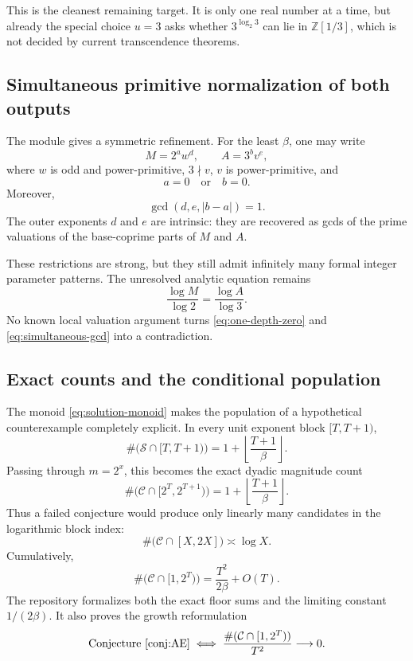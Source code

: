 \documentclass[11pt,oneside]{article}
\theoremstyle{definition}
\theoremstyle{remark}
\newcommand{\Z}{\mathbb Z}
\newcommand{\Sol}{\mathcal S}
\newcommand{\Cand}{\mathcal C}
\begin{document}
This is the cleanest remaining target.  It is only one real number at a time, but already the
special choice $u=3$ asks whether $3^{\log_2 3}$ can lie in $\Z[1/3]$, which is not decided by
current transcendence theorems.

\subsection{Simultaneous primitive normalization of both outputs}

The module  gives a symmetric refinement.  For the least
$\beta$, one may write
\[
  M=2^aw^d,
  \qquad A=3^bv^e,
\]
where $w$ is odd and power-primitive, $3\nmid v$, $v$ is power-primitive, and
\begin{equation}
  a=0\quad\text{or}\quad b=0.
  \label{eq:one-depth-zero}
\end{equation}
Moreover,
\begin{equation}
 \gcd\!\left(d,e,|b-a|\right)=1.
 \label{eq:simultaneous-gcd}
\end{equation}
The outer exponents $d$ and $e$ are intrinsic: they are recovered as gcds of the prime
valuations of the base-coprime parts of $M$ and $A$.

These restrictions are strong, but they still admit infinitely many formal integer parameter
patterns.  The unresolved analytic equation remains
\[
  \frac{\log M}{\log2}=\frac{\log A}{\log3}.
\]
No known local valuation argument turns \eqref{eq:one-depth-zero} and
\eqref{eq:simultaneous-gcd} into a contradiction.

\subsection{Exact counts and the conditional population}

The monoid \eqref{eq:solution-monoid} makes the population of a hypothetical counterexample
completely explicit.  In every unit exponent block $[T,T+1)$,
\begin{equation}
 \#\bigl(\Sol\cap[T,T+1)\bigr)
 =1+\left\lfloor\frac{T+1}{\beta}\right\rfloor.
 \label{eq:unit-count}
\end{equation}
Passing through $m=2^x$, this becomes the exact dyadic magnitude count
\begin{equation}
 \#\bigl(\Cand\cap[2^T,2^{T+1})\bigr)
 =1+\left\lfloor\frac{T+1}{\beta}\right\rfloor.
 \label{eq:dyadic-count}
\end{equation}
Thus a failed conjecture would produce only linearly many candidates in the logarithmic block
index:
\[
 \#\bigl(\Cand\cap[X,2X]\bigr)\asymp\log X.
\]
Cumulatively,
\begin{equation}
 \#\bigl(\Cand\cap[1,2^T)\bigr)
 =\frac{T^2}{2\beta}+O(T).
 \label{eq:cumulative-quadratic}
\end{equation}
The repository formalizes both the exact floor sums and the limiting constant
$1/(2\beta)$.  It also proves the growth reformulation
\begin{equation}
 \text{Conjecture~\ref{conj:AE}}
 \iff
 \frac{\#(\Cand\cap[1,2^T))}{T^2}\longrightarrow0.
 \label{eq:growth-equivalence}
\end{equation}
\end{document}
